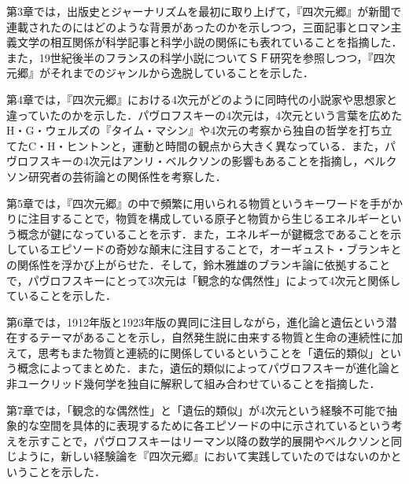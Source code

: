 \documentclass[uplatex,a4j,11pt]{jsarticle}
\begin{document}
第3章では，出版史とジャーナリズムを最初に取り上げて，『四次元郷』が新聞で連載されたのにはどのような背景があったのかを示しつつ，三面記事とロマン主義文学の相互関係が科学記事と科学小説の関係にも表れていることを指摘した．また，19世紀後半のフランスの科学小説についてＳＦ研究を参照しつつ，『四次元郷』がそれまでのジャンルから逸脱していることを示した．

第4章では，『四次元郷』における4次元がどのように同時代の小説家や思想家と違っていたのかを示した．パヴロフスキーの4次元は，4次元という言葉を広めたH・G・ウェルズの『タイム・マシン』や4次元の考察から独自の哲学を打ち立てたC・H・ヒントンと，運動と時間の観点から大きく異なっている．また，パヴロフスキーの4次元はアンリ・ベルクソンの影響もあることを指摘し，ベルクソン研究者の芸術論との関係性を考察した．

第5章では，『四次元郷』の中で頻繁に用いられる物質というキーワードを手がかりに注目することで，物質を構成している原子と物質から生じるエネルギーという概念が鍵になっていることを示す．また，エネルギーが鍵概念であることを示しているエピソードの奇妙な顛末に注目することで，オーギュスト・ブランキとの関係性を浮かび上がらせた．そして，鈴木雅雄のブランキ論に依拠することで，パヴロフスキーにとって3次元は「観念的な偶然性」によって4次元と関係していることを示した．

第6章では，1912年版と1923年版の異同に注目しながら，進化論と遺伝という潜在するテーマがあることを示し，自然発生説に由来する物質と生命の連続性に加えて，思考もまた物質と連続的に関係しているということを「遺伝的類似」という概念によってまとめた．また，遺伝的類似によってパヴロフスキーが進化論と非ユークリッド幾何学を独自に解釈して組み合わせていることを指摘した．

第7章では，「観念的な偶然性」と「遺伝的類似」が4次元という経験不可能で抽象的な空間を具体的に表現するために各エピソードの中に示されているという考えを示すことで，パヴロフスキーはリーマン以降の数学的展開やベルクソンと同じように，新しい経験論を『四次元郷』において実践していたのではないのかということを示した．
\end{document}
